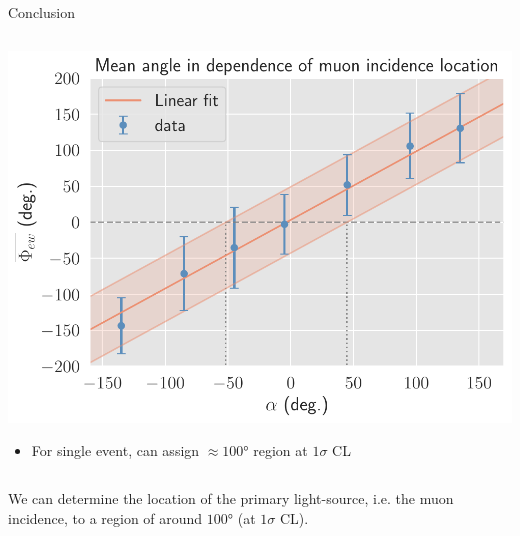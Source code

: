 \documentclass[aspectratio=169]{beamer}
\begin{document}
	\begin{frame}{Conclusion}
		\vspace{-.7cm}
		\begin{columns}
			
%				
			
			\begin{column}{0.9\textwidth}
				\centering
				\includegraphics[width=.6\textwidth]{./new_alex/confidence_phi.pdf}
				
				\begin{itemize}
					\centering 
					\item For single event, can assign $\approx\ang{100}$ region at $1\sigma$ CL
				\end{itemize}
						
			\end{column}
				
			
		\end{columns}
	\vspace{.3cm}
			\centering
		We can determine the location of the primary light-source, i.e. the muon incidence, to a region of around $\ang{100}$ (at $1\sigma$ CL).
	
		\centering
		
		
	\end{frame}
\end{document}
